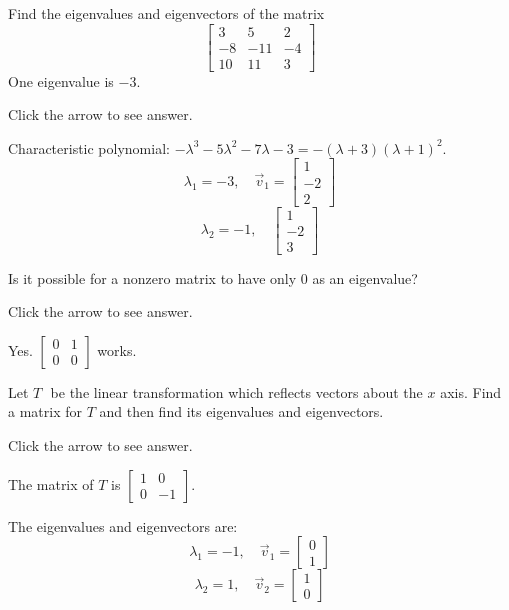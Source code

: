 \documentclass{ximera}
\begin{document}
\begin{problem}\label{prb:8.13} Find the eigenvalues and eigenvectors of the matrix
\begin{equation*}
\left[
\begin{array}{rrr}
3 & 5 & 2 \\
-8 & -11 & -4 \\
10 & 11 & 3
\end{array}
\right]
\end{equation*}
One eigenvalue is $-3$.

Click the arrow to see answer.
\begin{expandable}
Characteristic polynomial: $-\lambda^3-5\lambda^2-7\lambda-3=-(\lambda+3)(\lambda+1)^2$.
    $$\lambda_1=-3,\quad \vec{v}_1=\begin{bmatrix}1\\-2\\2\end{bmatrix}$$
    $$\lambda_2=-1,\quad \begin{bmatrix}1\\-2\\3\end{bmatrix}$$
\end{expandable}

\end{problem}

\begin{problem}\label{prb:8.14} Is it possible for a nonzero matrix to have only $0$ as an eigenvalue?

Click the arrow to see answer.
\begin{expandable}
Yes. $\left[
\begin{array}{cc}
0 & 1 \\
0 & 0%
\end{array}
\right] $ works.
\end{expandable}
\end{problem}

\begin{problem}\label{prb:8.17} Let $T\,$\ be the linear transformation which reflects vectors about
the $x$ axis. Find a matrix for $T$ and then find its eigenvalues and
eigenvectors.

Click the arrow to see answer.

\begin{expandable}
The matrix of $T$ is $\left[
\begin{array}{rr}
1 & 0 \\
0 & -1
\end{array}
\right]$. 

The eigenvalues and eigenvectors are:
$$\lambda_1=-1,\quad \vec{v}_1=\begin{bmatrix}0\\1\end{bmatrix}$$
$$\lambda_2=1,\quad \vec{v}_2=\begin{bmatrix}1\\0\end{bmatrix}$$
\end{expandable}
\end{problem}
\end{document}
